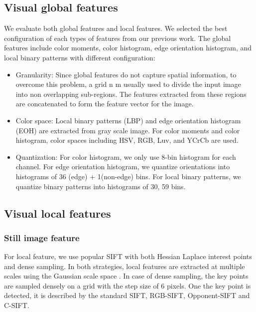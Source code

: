 \documentclass[twocolumn]{bmcart}%
\begin{document}
\subsection{Visual global features}

We evaluate both global features and local features. We selected the best configuration of each types of features from our previous work\cite{lam2012nii}. The global features include color moments, color histogram, edge orientation histogram, and local binary patterns with different configuration:

\begin{itemize}
	\item Granularity:  Since global features do not capture spatial information, to overcome this problem, a grid n  m usually used to divide the input image into non overlapping sub-regions. The features extracted from these regions are concatenated to form the feature vector for the image.
	\item Color space: Local binary patterns (LBP) and edge orientation histogram (EOH) are extracted from gray scale image. For color moments and color histogram, color spaces including HSV, RGB, Luv, and YCrCb are used.
	\item Quantization: For color histogram, we only use 8-bin histogram for each channel. For edge orientation histogram, we quantize orientations into histograms of 36 (edge) + 1(non-edge) bins. For local binary patterns, we quantize binary patterns into histograms of 30, 59 bins.
\end{itemize}

\subsection{Visual local features}
\subsubsection{Still image feature}

For local feature, we use popular SIFT with both Hessian Laplace interest points \cite{mikolajczyk2002affine} and dense sampling. In both strategies, local features are extracted at multiple scales using the Gaussian scale space \cite{mikolajczyk2002affine}. In case of dense sampling, the key points are sampled densely on a grid with the step size of 6 pixels. One the key point is detected, it is described by the standard SIFT, RGB-SIFT, Opponent-SIFT and C-SIFT.
\end{document}
